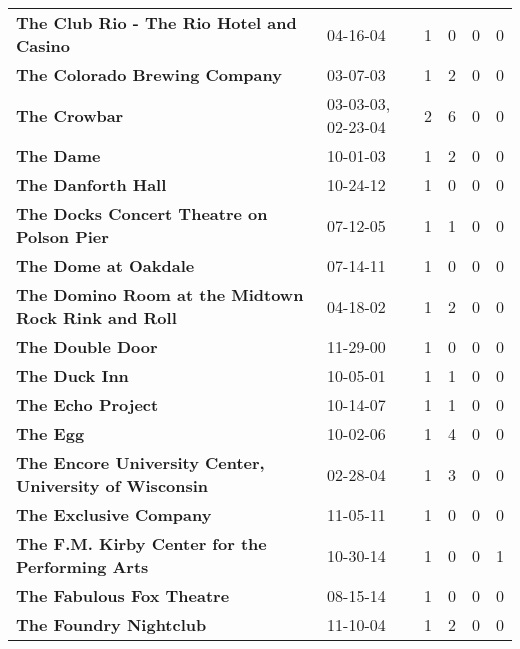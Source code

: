 \begin{supertabular}{p{0.4\textwidth}p{0.3\textwidth}p{0.05\textwidth}p{0.05\textwidth}p{0.05\textwidth}p{0.05\textwidth}}
                     \textbf{The Club Rio - The Rio Hotel and Casino} &            04-16-04 &  1 &  0 &  0 &  0 \\
                                \textbf{The Colorado Brewing Company} &            03-07-03 &  1 &  2 &  0 &  0 \\
                                                 \textbf{The Crowbar} &  03-03-03, 02-23-04 &  2 &  6 &  0 &  0 \\
                                                    \textbf{The Dame} &            10-01-03 &  1 &  2 &  0 &  0 \\
                                           \textbf{The Danforth Hall} &            10-24-12 &  1 &  0 &  0 &  0 \\
                    \textbf{The Docks Concert Theatre on Polson Pier} &            07-12-05 &  1 &  1 &  0 &  0 \\
                                         \textbf{The Dome at Oakdale} &            07-14-11 &  1 &  0 &  0 &  0 \\
           \textbf{The Domino Room at the Midtown Rock Rink and Roll} &            04-18-02 &  1 &  2 &  0 &  0 \\
                                             \textbf{The Double Door} &            11-29-00 &  1 &  0 &  0 &  0 \\
                                                \textbf{The Duck Inn} &            10-05-01 &  1 &  1 &  0 &  0 \\
                                            \textbf{The Echo Project} &            10-14-07 &  1 &  1 &  0 &  0 \\
                                                     \textbf{The Egg} &            10-02-06 &  1 &  4 &  0 &  0 \\
       \textbf{The Encore University Center, University of Wisconsin} &            02-28-04 &  1 &  3 &  0 &  0 \\
                                       \textbf{The Exclusive Company} &            11-05-11 &  1 &  0 &  0 &  0 \\
               \textbf{The F.M. Kirby Center for the Performing Arts} &            10-30-14 &  1 &  0 &  0 &  1 \\
                                    \textbf{The Fabulous Fox Theatre} &            08-15-14 &  1 &  0 &  0 &  0 \\
                                       \textbf{The Foundry Nightclub} &            11-10-04 &  1 &  2 &  0 &  0 \\

\end{supertabular}
